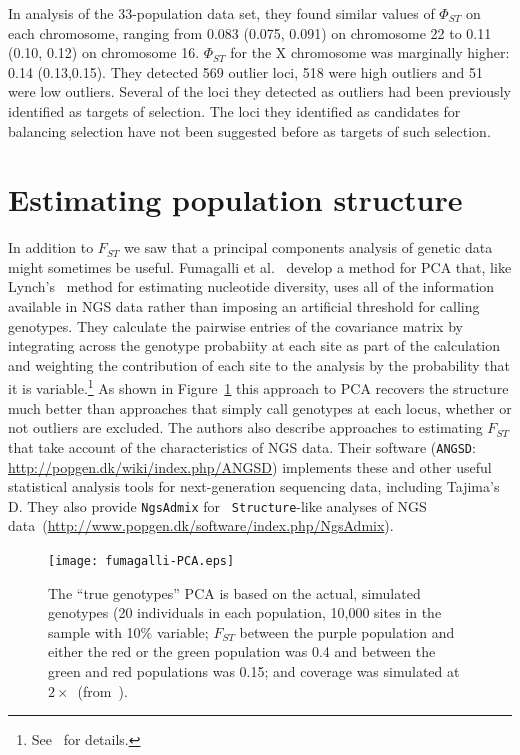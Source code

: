 \documentclass[12pt]{article}
\begin{document}
In analysis of the 33-population data set, they found similar values
of $\Phi_{ST}$ on each chromosome, ranging from 0.083 (0.075, 0.091)
on chromosome 22 to 0.11 (0.10, 0.12) on chromosome 16. $\Phi_{ST}$
for the X chromosome was marginally higher: 0.14 (0.13,0.15). They
detected 569 outlier loci, 518 were high outliers and 51 were low
outliers. Several of the loci they detected as outliers had been
previously identified as targets of selection. The loci they
identified as candidates for balancing selection have not been
suggested before as targets of such selection.

\section*{Estimating population structure}

In addition to $F_{ST}$ we saw that a principal components analysis of
genetic data might sometimes be useful. Fumagalli et
al.~\cite{Fumagalli-etal-2013} develop a method for PCA that, like
Lynch's~\cite{Lynch-2008} method for estimating nucleotide diversity,
uses all of the information available in NGS data rather than imposing
an artificial threshold for calling genotypes. They calculate the
pairwise entries of the covariance matrix by integrating across the
genotype probabiity at each site as part of the calculation and
weighting the contribution of each site to the analysis by the
probability that it is
variable.\footnote{See~\cite{Fumagalli-etal-2013} for details.} As
shown in Figure~\ref{fig:Fumagalli-PCA} this approach to PCA recovers
the structure much better than approaches that simply call genotypes
at each locus, whether or not outliers are excluded. The authors also
describe approaches to estimating $F_{ST}$ that take account of the
characteristics of NGS data. Their software ({\tt ANGSD}:
\url{http://popgen.dk/wiki/index.php/ANGSD}) implements these and
other useful statistical analysis tools for next-generation sequencing
data, including Tajima's D. They also provide {\tt NgsAdmix} for {\tt
  Structure}-like analyses of NGS
data~(\url{http://www.popgen.dk/software/index.php/NgsAdmix}). 

\begin{figure}
\begin{center}
\texttt{[image: fumagalli-PCA.eps]}
\end{center}
\caption{The ``true genotypes'' PCA is based on the actual, simulated
  genotypes (20 individuals in each population, 10,000 sites in the
  sample with 10\% variable; $F_{ST}$ between the purple population
  and either the red or the green population was 0.4 and between the
  green and red populations was 0.15; and coverage was simulated at
  $2\times$~(from~\cite{Fumagalli-etal-2013}).}\label{fig:Fumagalli-PCA}
\end{figure}
\end{document}

